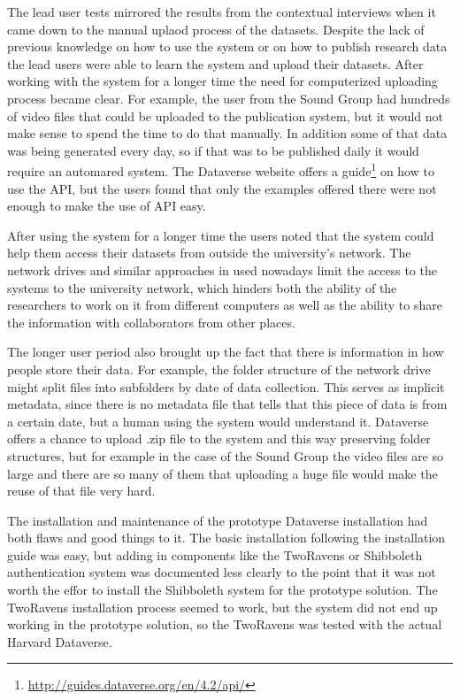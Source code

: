 The lead user tests mirrored the results from the contextual interviews when
it came down to the manual uplaod process of the datasets. Despite the lack of
previous knowledge on how to use the system or on how to publish research data
the lead users were able to learn the system and upload their datasets. After
working with the system for a longer time the need for computerized uploading
process became clear. For example, the user from the Sound Group had hundreds
of video files that could be uploaded to the publication system, but it would
not make sense to spend the time to do that manually. In addition some of that
data was being generated every day, so if that was to be published daily it
would require an automared system. The Dataverse website offers a
guide\footnote{\url{http://guides.dataverse.org/en/4.2/api/}} on how
to use the API, but the users found that only the examples offered there were
not enough to make the use of API easy.

After using the system for a longer time the users noted that the system could
help them access their datasets from outside the university's network. The
network drives and similar approaches in used nowadays limit the access to
the systems to the university network, which hinders both the ability of the
researchers to work on it from different computers as well as the ability to
share the information with collaborators from other places.

The longer user period also brought up the fact that there is information in
how people store their data. For example, the folder structure of the network
drive might split files into subfolders by date of data collection. This serves
as implicit metadata, since there is no metadata file that tells that this
piece of data is from a certain date, but a human using the system would
understand it. Dataverse offers a chance to upload .zip file to the system
and this way preserving folder structures, but for example in the case of
the Sound Group the video files are so large and there are so many of them
that uploading a huge file would make the reuse of that file very hard.

The installation and maintenance of the prototype Dataverse installation had
both flaws and good things to it. The basic installation following the
installation guide was easy, but adding in components like the TwoRavens or
Shibboleth authentication system was documented less clearly to the point that
it was not worth the effor to install the Shibboleth system for the prototype
solution. The TwoRavens installation process seemed to work, but the system
did not end up working in the prototype solution, so the TwoRavens was tested
with the actual Harvard Dataverse.

